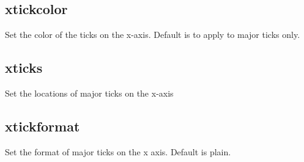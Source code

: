 \documentclass[letterpaper,10pt,english]{sphinxmanual}
\begin{document}
\begin{sphinxVerbatim}[commandchars=\\\{\}]
\PYG{p}{[}\PYG{p}{]}    
\end{sphinxVerbatim}


\subsection{xtickcolor}
\label{\detokenize{plot_control_cmds:xtickcolor}}
Set the color of the ticks on the x-axis. Default is to apply to major ticks only.

\begin{sphinxVerbatim}[commandchars=\\\{\}]
\PYG{p}{[}\PYG{p}{]}     \PYG{p}{[}     \PYG{p}{]}
\end{sphinxVerbatim}


\subsection{xticks}
\label{\detokenize{plot_control_cmds:xticks}}
Set the locations of major ticks on the x-axis

\begin{sphinxVerbatim}[commandchars=\\\{\}]
\PYG{p}{[}\PYG{p}{]}               
\end{sphinxVerbatim}


\subsection{xtickformat}
\label{\detokenize{plot_control_cmds:xtickformat}}
Set the format of major ticks on the x axis. Default is plain.

\begin{sphinxVerbatim}[commandchars=\\\{\}]
\PYG{p}{[}\PYG{p}{]}        
\end{sphinxVerbatim}
\end{document}
